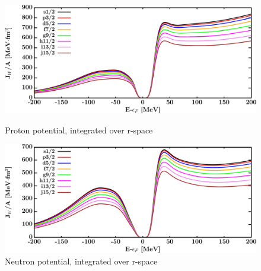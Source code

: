 \begin{figure}[H]
    \centering
    \begin{minipage}{0.45\textwidth}
        \centering
        \includegraphics[width=1.0\textwidth]{figures/sn112_protonVolumeIntegrals.png}
        \caption{Proton potential, integrated over r-space}
        \label{DOMFitData_sn112_proton_potentialIntegral}
    \end{minipage}\hfill
    \begin{minipage}{0.45\textwidth}
        \centering
        \includegraphics[width=1.0\textwidth]{figures/sn112_neutronVolumeIntegrals.png}
        \caption{Neutron potential, integrated over r-space}
        \label{DOMFitData_sn112_neutron_potentialIntegral}
    \end{minipage}
\end{figure}

\afterpage{\clearpage}


